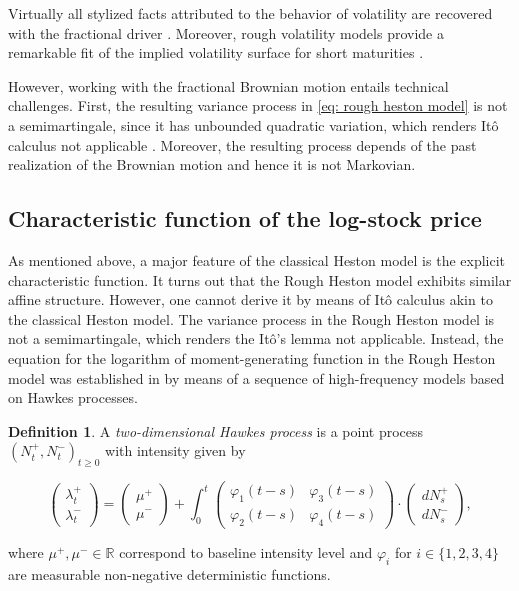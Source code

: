 \documentclass[12pt,twoside]{article}
\theoremstyle{plain}
\theoremstyle{plain}
\theoremstyle{definition}
\newtheorem{definition}[proposition]{Definition}
\theoremstyle{remark}
\numberwithin{equation}{section}
\begin{document}
Virtually all stylized facts attributed to the behavior of volatility are recovered with the fractional driver \cite{ER16}. Moreover, rough volatility models provide a remarkable fit of the implied volatility surface for short maturities \cite{BFG16}.

However, working with the fractional Brownian motion entails technical challenges. First, the resulting variance process in \eqref{eq: rough heston model} is not a semimartingale, since it has unbounded quadratic variation, which renders Itô calculus not applicable \cite{ER16}. Moreover, the resulting process depends of the past realization of the Brownian motion and hence it is not Markovian.

\subsection{Characteristic function of the log-stock price}
\label{sec: characteristic function rough heston}

As mentioned above, a major feature of the classical Heston model is the explicit characteristic function. It turns out that the Rough Heston model exhibits similar affine structure. However, one cannot derive it by means of Itô calculus akin to the classical Heston model. The variance process in the Rough Heston model is not a semimartingale, which renders the Itô's lemma not applicable. Instead, the equation for the logarithm of moment-generating function in the Rough Heston model was established in \cite{ER16} by means of a sequence of high-frequency models based on Hawkes processes.

\begin{definition}

A \emph{two-dimensional Hawkes process} is a point process $\left(N_{t}^{+}, N_{t}^{-}\right)_{t \geq 0}$ with intensity given by

\begin{equation}
\label{eq: hawkes process}
\left(\begin{array}{c}\lambda_{t}^{+} \\ \lambda_{t}^{-}\end{array}\right)=\left(\begin{array}{c}\mu^{+} \\ \mu^{-}\end{array}\right)+\int_{0}^{t}\left(\begin{array}{cc}\varphi_{1}(t-s) & \varphi_{3}(t-s) \\ \varphi_{2}(t-s) & \varphi_{4}(t-s)\end{array}\right) \cdot\left(\begin{array}{c}d N_{s}^{+} \\ d N_{s}^{-}\end{array}\right),
\end{equation}

where $\mu^+, \mu^- \in \mathbb R$ correspond to baseline intensity level and $\varphi_i$ for $i \in \{1,2,3,4\}$ are measurable non-negative deterministic functions.

\end{definition}
\end{document}
